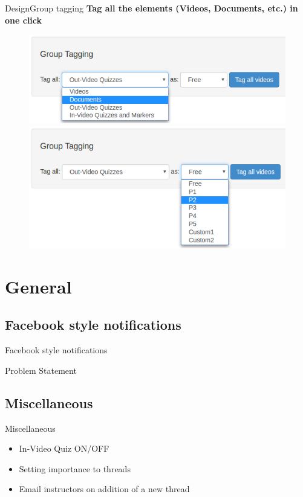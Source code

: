 \documentclass[xcolor=table]{beamer}
\begin{document}
\begin{frame}{Design}{Group tagging}
\textbf{Tag all the elements (Videos, Documents, etc.) in one click}
	\begin{figure}
	\centering
	\includegraphics[width=0.6\linewidth]{media/gt1} \\
	\includegraphics[width=0.6\linewidth]{media/gt2}
	\label{fig:gt}
	\end{figure}
\end{frame}

\section{General}

\subsection{Facebook style notifications}

\begin{frame}{Facebook style notifications}
	\begin{block}{Problem Statement}
	\end{block}
\end{frame}

\subsection{Miscellaneous}

\begin{frame}{Miscellaneous}
	\begin{itemize}
		\item In-Video Quiz ON/OFF
		\item Setting importance to threads
		\item Email instructors on addition of a new thread
	\end{itemize}
\end{frame}
\end{document}
